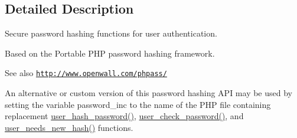 \subsection{Detailed Description}
Secure password hashing functions for user authentication.

Based on the Portable PHP password hashing framework. \begin{DoxySeeAlso}{See also}
\href{http://www.openwall.com/phpass/}{\tt http://www.openwall.com/phpass/}
\end{DoxySeeAlso}
An alternative or custom version of this password hashing API may be used by setting the variable password\_\-inc to the name of the PHP file containing replacement \hyperlink{password_8inc_a7fa51cbbe5dd15f39953097ea25eb237}{user\_\-hash\_\-password()}, \hyperlink{password_8inc_a8fca5fd75cd7a3c609e21a48ef087868}{user\_\-check\_\-password()}, and \hyperlink{password_8inc_a5c5ff8dd0c7fb7880535bacd445a5574}{user\_\-needs\_\-new\_\-hash()} functions. 

